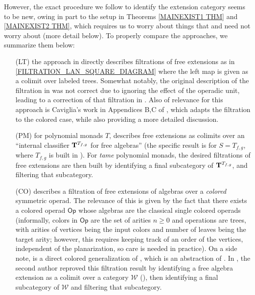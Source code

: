 \documentclass{article}
\begin{document}
\begin{itemize}
	However, the exact procedure we follow to identify 
	the extension category seems to be new,
	owing in part to the setup in 
	Theorems \ref{MAINEXIST1 THM} and \ref{MAINEXIST2 THM},
	which requires us to worry about things that 
	\cite{BM03} and \cite{BB17} need not worry about
	(more detail below).
	To properly compare the approaches, we summarize them below:
\begin{itemize}
	\item[(LT)] the approach in 
	\cite[\S 5.11]{BM03}
	directly describes filtrations of free extensions as in
	\eqref{FILTRATION_LAN_SQUARE_DIAGRAM}
	where the left map is given as a colimit over labeled trees.
	Somewhat notably, the original description of 
	the filtration in \cite[\S 5.11]{BM03}
	was not correct due to ignoring the effect of the operadic unit,
	leading to a correction of that filtration in 
	\cite{BM09}.
	Also of relevance for this approach is Caviglia's work in Appendices B,C of \cite{Cav},
	which adapts the \cite{BM03} filtration 
	to the colored case, while also providing a more detailed discussion.
\item[(PM)] 
	for polynomial monads $T$, \cite{BB17} describes free extensions as colimits over
	an ``internal classifier 
	$\bold{T}^{T_{f,g}}$ for free algebras''
	(the specific result is \cite[Thm. 6.17]{BB17}
	for $S = T_{f,g}$, where 
	$T_{f,g}$ is built in \cite[\S 7]{BB17}).
	For \emph{tame} polynomial monads, 
	the desired filtrations of free extensions are then 
	built by identifying a final subcategory of
	$\bold{T}^{T_{f,g}}$,
	and filtering that subcategory.
\item[(CO)]
	\cite[Prop. 4.3.16]{WY18} describes a filtration 
	of free extensions of algebras over a 
	\emph{colored} symmetric operad. 
	The relevance of this is given by
	the fact that there exists a colored operad
	$\mathsf{Op}$ whose algebras are the classical single colored operads
	(informally, colors in $\mathsf{Op}$
	are the set of arities $n \geq 0$
	and operations are trees, with arities of vertices being the input colors and number of leaves being the target arity;
	however, this requires keeping track of an order of the vertices, independent of the planarization,
	so care is needed in practice).
	On a side note,
	\cite[Prop. 4.3.16]{WY18} is a 
	direct colored generalization
	of \cite[(7.12)]{Ha10},
	which is an abstraction of 
	\cite[Prop. 4.20]{Ha10}.
	In \cite[Prop. 5.20]{Pe16},
	the second author reproved this filtration result by identifying a free algebra extension
	as a colimit over a category $\mathcal{W}$
	(\cite[Def. 5.26]{Pe16}),
	then identifying a final subcategory of $\mathcal{W}$
	and filtering that subcategory.
\end{itemize}	



\end{itemize}
\end{document}
